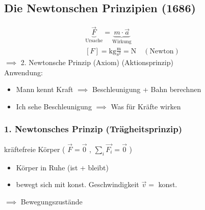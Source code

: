 \subsection{Die Newtonschen Prinzipien (1686)}
\begin{gather*}
	\underbrace{\vec{F}}_{\text{Ursache}} = \underbrace{m \cdot \vec{a}}_{\text{Wirkung}} \\
	[F] = \text{kg} \frac{\text{m}}{\text{s}^2} = \text{N} \quad ( \text{Newton} )
\end{gather*}
$\implies$ 2. Newtonsche Prinzip (Axiom) (Aktionsprinzip) \\
Anwendung: \\
\begin{itemize}
	\item Mann kennt Kraft $\implies$ Beschleunigung + Bahn berechnen
	\item Ich sehe Beschleunigung $\implies$ Was für Kräfte wirken
\end{itemize}
\subsubsection{1. Newtonsches Prinzip (Trägheitsprinzip)}
kräftefreie Körper ( $\vec{F} = \vec{0}$ , $\sum_i \vec{F_i} = \vec{0}$ )
\begin{itemize}[ label = $\rightarrow$ ]
	\item Körper in Ruhe (ist + bleibt)
	\item bewegt sich mit konst. Geschwindigkeit $\vec{v} =$ konst.
\end{itemize}
$\implies$ Bewegungszustände

